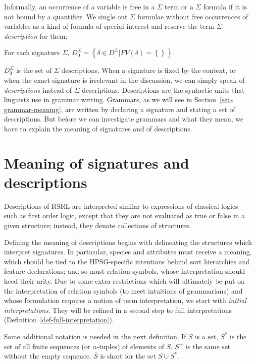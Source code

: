 \documentclass[output=paper
                ,modfonts
                ,nonflat
	        ,collection
	        ,collectionchapter
	        ,collectiontoclongg
 	        ,biblatex
                ,babelshorthands
                ,newtxmath
                ,draftmode
                ,colorlinks, citecolor=brown
]{./langsci/langscibook}
\begin{document}
{{Informally, an occurrence of a variable is free in a $\Sigma$ term or a
$\Sigma$ formula if it is not bound by a quantifier. We single out
$\Sigma$ formulae without free occurrences of variables as a kind of formula
of special interest and reserve the term $\Sigma$ \emph{description} for them:

\begin{mydef}
  For each signature $\Sigma$,
  $D_0^{\Sigma}=\left\{\delta\in D^{\Sigma} | FV(\delta)=\left\{\right\}\right\}$.
\end{mydef}

$D_0^{\Sigma}$ is the set of $\Sigma$ descriptions.
When a signature is fixed by the context, or when the exact signature is
irrelevant in the discussion, we can simply speak of \emph{descriptions}
instead of $\Sigma$ descriptions. Descriptions are the syntactic units
that linguists use in grammar writing. Grammars, as we will see in
Section~\ref{sec-grammar-meaning}, are written by declaring a signature
and stating a set of descriptions. But before we can investigate grammars and
what they mean, we
have to explain the meaning of signatures and of descriptions.


  
\section{Meaning of signatures and descriptions}
\label{sec-meaning}

Descriptions of RSRL are interpreted similar to expressions of
classical logics such as first order logic, except that they are not
evaluated as true or false in a given structure; instead, they denote
collections of structures.

Defining the meaning of descriptions begins with delineating the
structures which interpret signatures. In particular, species and
attributes must receive a meaning, which should be tied to the
HPSG-specific intentions behind sort hierarchies and feature
declarations; and so must relation symbols, whose interpretation
should heed their arity. Due to some extra restrictions which will
ultimately be put on the interpretation of relation symbols (to meet
intuitions of grammarians) and whose
formulation requires a notion of term interpretation, we start with
\emph{initial interpretations}. They will be refined in a second
step to full interpretations (Definition~\ref{def-full-interpretation}).

Some additional notation is needed in the next definition. If $S$ is a
set, $S^{*}$ is the set of all finite sequences (or $n$-tuples) of elements
of $S$. $S^{+}$ is the same set without the empty sequence. $\overline{S}$
is short for the set $S\cup S^{*}$.

}}
\end{document}
